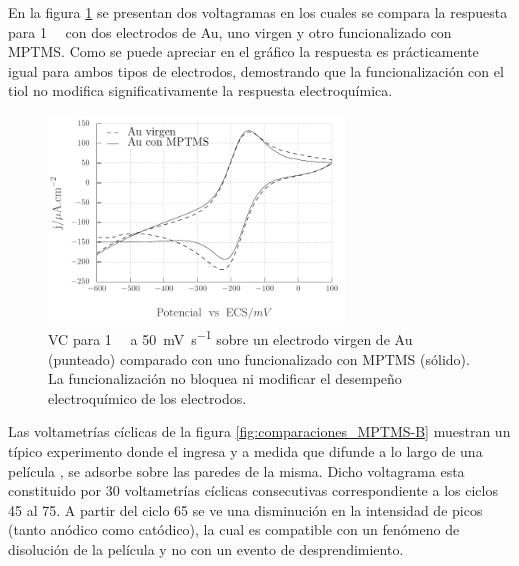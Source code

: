 			 En la figura \ref{fig:comparaciones_MPTMS-A} se presentan dos voltagramas en los cuales se compara la respuesta para \aminorutenio\space \SI{1}{\milli\Molar} con dos electrodos de Au, uno virgen y otro funcionalizado con MPTMS. Como se puede apreciar en el gráfico la respuesta es prácticamente igual para ambos tipos de electrodos, demostrando que la funcionalización con el tiol no modifica significativamente la respuesta electroquímica.

					\begin{figure}[!ht]
							\begin{center}
							\includegraphics[width=0.70\textwidth]{Graficos/Comparacion_Au-MPTMS.pdf}
							\caption[Comparación de electrodos con y sin MPTMS]{VC para \aminorutenio\space \SI{1}{\milli\Molar} a \SI{50}{\milli\volt\per\second} sobre un electrodo virgen de Au (punteado) comparado con uno funcionalizado con MPTMS (sólido). La funcionalización no bloquea ni modificar el desempeño electroquímico de los electrodos.}
							\label{fig:comparaciones_MPTMS-A}
							\end{center}
							\end{figure}

             Las voltametrías cíclicas de la figura \ref{fig:comparaciones_MPTMS-B} muestran un típico experimento donde el \aminorutenio\space ingresa y a medida que difunde a lo largo de una película \pdmF, se adsorbe sobre las paredes de la misma. Dicho voltagrama esta constituido por 30 voltametrías cíclicas consecutivas correspondiente a los ciclos 45 al 75. A partir del ciclo 65 se ve una disminución en la intensidad de picos (tanto anódico como catódico), la cual es compatible con un fenómeno de disolución de la película y no con un evento de desprendimiento. 

